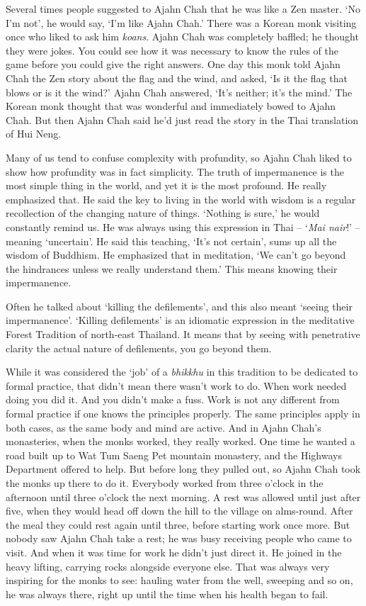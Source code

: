 Several times people suggested to Ajahn Chah that he was like a Zen
master. `No I'm not', he would say, `I'm like Ajahn Chah.' There was a
Korean monk visiting once who liked to ask him \emph{koans}. Ajahn Chah
was completely baffled; he thought they were jokes. You could see how it
was necessary to know the rules of the game before you could give the
right answers. One day this monk told Ajahn Chah the Zen story about the
flag and the wind, and asked, `Is it the flag that blows or is it the
wind?' Ajahn Chah answered, `It's neither; it's the mind.' The Korean
monk thought that was wonderful and immediately bowed to Ajahn Chah. But
then Ajahn Chah said he'd just read the story in the Thai translation of
Hui Neng. 

Many of us tend to confuse complexity with profundity, so Ajahn Chah
liked to show how profundity was in fact simplicity. The truth of
impermanence is the most simple thing in the world, and yet it is the
most profound. He really emphasized that. He said the key to living in
the world with wisdom is a regular recollection of the changing nature
of things. `Nothing is sure,' he would constantly remind us. He was
always using this expression in Thai -- `\emph{Mai nair}!' -- meaning
`uncertain'. He said this teaching, `It's not certain', sums up all the
wisdom of Buddhism. He emphasized that in meditation, `We can't go
beyond the hindrances unless we really understand them.' This means
knowing their impermanence. 

Often he talked about `killing the defilements', and this also meant
`seeing their impermanence'. `Killing defilements' is an idiomatic
expression in the meditative Forest Tradition of north-east Thailand. It
means that by seeing with penetrative clarity the actual nature of
defilements, you go beyond them. 

While it was considered the `job' of a \emph{bhikkhu} in this tradition
to be dedicated to formal practice, that didn't mean there wasn't work
to do. When work needed doing you did it. And you didn't make a fuss. 
Work is not any different from formal practice if one knows the
principles properly. The same principles apply in both cases, as the
same body and mind are active. And in Ajahn Chah's monasteries, when the
monks worked, they really worked. One time he wanted a road built up to
Wat Tum Saeng Pet mountain monastery, and the Highways Department
offered to help. But before long they pulled out, so Ajahn Chah took the
monks up there to do it. Everybody worked from three o'clock in the
afternoon until three o'clock the next morning. A rest was allowed until
just after five, when they would head off down the hill to the village
on alms-round. After the meal they could rest again until three, before
starting work once more. But nobody saw Ajahn Chah take a rest; he was
busy receiving people who came to visit. And when it was time for work
he didn't just direct it. He joined in the heavy lifting, carrying rocks
alongside everyone else. That was always very inspiring for the monks to
see: hauling water from the well, sweeping and so on, he was always
there, right up until the time when his health began to fail. 

